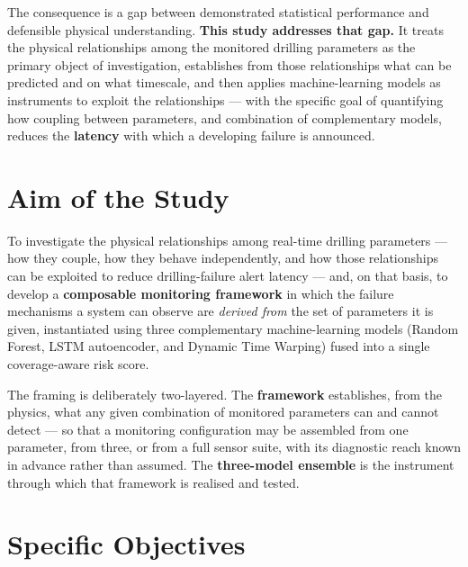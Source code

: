 \documentclass[12pt,a4paper]{report}
\begin{document}
The consequence is a gap between demonstrated statistical performance and defensible physical
understanding. \textbf{This study addresses that gap.} It treats the physical relationships among the monitored
drilling parameters as the primary object of investigation, establishes from those relationships what can
be predicted and on what timescale, and then applies machine-learning models as instruments to exploit
the relationships --- with the specific goal of quantifying how coupling between parameters, and
combination of complementary models, reduces the \textbf{latency} with which a developing failure is announced.

\section{Aim of the Study}

To investigate the physical relationships among real-time drilling parameters --- how they couple, how they
behave independently, and how those relationships can be exploited to reduce drilling-failure alert
latency --- and, on that basis, to develop a \textbf{composable monitoring framework} in which the failure
mechanisms a system can observe are \emph{derived from} the set of parameters it is given, instantiated using
three complementary machine-learning models (Random Forest, LSTM autoencoder, and Dynamic Time Warping)
fused into a single coverage-aware risk score.

The framing is deliberately two-layered. The \textbf{framework} establishes, from the physics, what any given
combination of monitored parameters can and cannot detect --- so that a monitoring configuration may be
assembled from one parameter, from three, or from a full sensor suite, with its diagnostic reach known in
advance rather than assumed. The \textbf{three-model ensemble} is the instrument through which that framework is
realised and tested.

\section{Specific Objectives}
\end{document}
